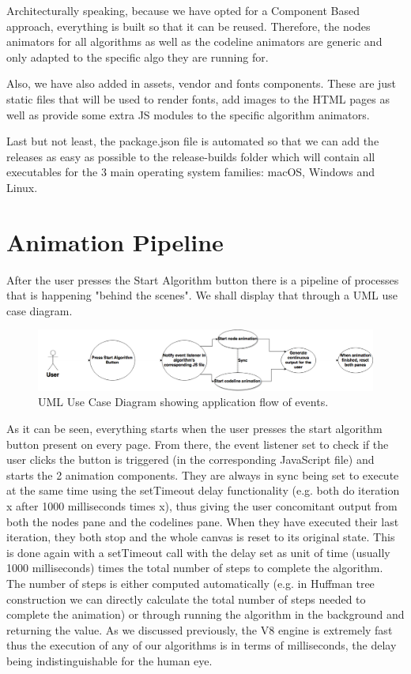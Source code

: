 \documentclass{l4proj}
\begin{document}
Architecturally speaking, because we have opted for a Component Based approach, everything is built so that it can be
reused. Therefore, the nodes animators for all algorithms as well as the codeline animators are generic and only
adapted to the specific algo they are running for. 

Also, we have also added in assets, vendor and fonts components. These are just static files that will be used to render fonts,
add images to the HTML pages as well as provide some extra JS modules to the specific algorithm animators. 

Last but not least, the package.json file is automated so that we can add the releases as easy as possible to the
release-builds folder which will contain all executables for the 3 main operating system families: macOS, Windows and
Linux.

\section{Animation Pipeline}

After the user presses the Start Algorithm button there is a pipeline of processes that is happening "behind the
scenes". We shall display that through a UML use case diagram.

\pagebreak

\begin{figure}[!ht]
    \centering
    \includegraphics[scale=0.3]{animation_uml_use_case_diagram}
    \caption{UML Use Case Diagram showing application flow of events.}
    \label{fig:animation_uml_use_case_diagram}
\end{figure}

As it can be seen, everything starts when the user presses the start algorithm button present on every page. From
there, the event listener set to check if the user clicks the button is triggered (in the corresponding JavaScript
file) and starts the 2 animation components. They are always in sync being set to execute at the same time using the
setTimeout delay functionality (e.g. both do iteration x after 1000 milliseconds times x), thus giving the user
concomitant output from both the nodes pane and the codelines pane. When they have executed their last iteration, they
both stop and the whole canvas is reset to its original state. This is done again with a setTimeout call with the delay
set as unit of time (usually 1000 milliseconds) times the total number of steps to complete the algorithm. The number
of steps is either computed automatically (e.g. in Huffman tree construction we can directly calculate the total number
of steps needed to complete the animation) or through running the algorithm in the background and returning the value.
As we discussed previously, the V8 engine is extremely fast thus the execution of any of our algorithms is in terms of
milliseconds, the delay being indistinguishable for the human eye. 
\end{document}

